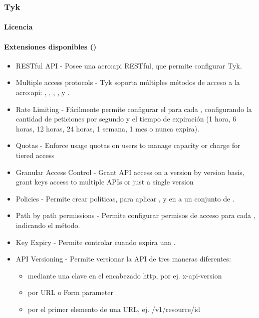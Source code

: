 \subsubsection{Tyk}
\label{soa:tecnologias:tyk}

\paragraph{Licencia}


\paragraph{Extensiones disponibles ()}

\begin{itemize}
  \item RESTful API - Posee una \gls{acro:api} RESTful, que permite configurar Tyk.
  \item Multiple access protocols - Tyk soporta múltiples métodos de acceso a la \gls{acro:api}: , , , ,  y .
  \item Rate Limiting - Fácilmente permite configurar el  para cada , configurando la cantidad de peticiones por segundo y el tiempo de expiración (1 hora, 6 horas, 12 horas, 24 horas, 1 semana, 1 mes o nunca expira).
  \item Quotas - Enforce usage quotas on users to manage capacity or charge for tiered access
  \item Granular Access Control - Grant API access on a version by version basis, grant keys access to multiple APIs or just a single version
  \item Policies - Permite crear políticas, para aplicar ,  y  en a un conjunto de .
  \item Path by path permissions - Permite configurar permisos de acceso para cada , indicando el método.
  \item Key Expiry - Permite controlar cuando expira una .
  \item API Versioning - Permite versionar la API de tres maneras diferentes:
  \begin{itemize}
    \item mediante una clave en el encabezado http, por ej. x-api-version
    \item por URL o Form parameter
    \item por el primer elemento de una URL, ej. /v1/resource/id

\end{itemize}
\end{itemize}
